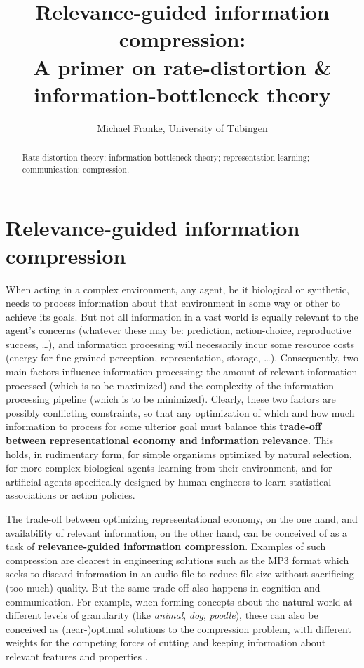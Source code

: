\documentclass[nobib,nofonts]{tufte-handout}
\title[Relevant compression]{Relevance-guided information compression: \\ \Large{A primer on rate-distortion \& information-bottleneck theory}}
\author[M.~Franke]{Michael Franke, University of Tübingen}
\date{} %
\begin{document}
\maketitle

\begin{abstract}
\noindent
Rate-distortion theory; information bottleneck theory; representation learning; communication; compression.
\end{abstract}

\noindent

\section{Relevance-guided information compression}

When acting in a complex environment, any agent, be it biological or synthetic, needs to process information about that environment in some way or other to achieve its goals.
But not all information in a vast world is equally relevant to the agent's concerns (whatever these may be: prediction, action-choice, reproductive success, \dots), and information processing will necessarily incur some resource costs (energy for fine-grained perception, representation, storage, \dots).
Consequently, two main factors influence information processing: the amount of relevant information processed (which is to be maximized) and the complexity of the information processing pipeline (which is to be minimized).
Clearly, these two factors are possibly conflicting constraints, so that any optimization of which and how much information to process for some ulterior goal must balance this \textbf{trade-off between representational economy and information relevance}.
This holds, in rudimentary form, for simple organisms optimized by natural selection, for more complex biological agents learning from their environment, and for artificial agents specifically designed by human engineers to learn statistical associations or action policies.

The trade-off between optimizing representational economy, on the one hand, and availability of relevant information, on the other hand, can be conceived of as a task of \textbf{relevance-guided information compression}.
Examples of such compression are clearest in engineering solutions such as the MP3 format which seeks to discard information in an audio file to reduce file size without sacrificing (too much) quality.
But the same trade-off also happens in cognition and communication.
For example, when forming concepts about the natural world at different levels of granularity (like \textit{animal}, \textit{dog}, \textit{poodle}), these can also be conceived as (near-)optimal solutions to the compression problem, with different weights for the competing forces of cutting and keeping information about relevant features and properties \citep{CorterGluck1992:Explaining-basi}.
\end{document}
